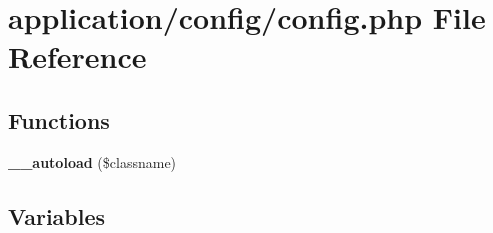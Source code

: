 \section{application/config/config.php File Reference}
\label{application_2config_2config_8php}
\subsection*{Functions}
\begin{DoxyCompactItemize}
\item 
{\bf \-\_\-\-\_\-autoload} (\$classname)
\end{DoxyCompactItemize}
\subsection*{Variables}
